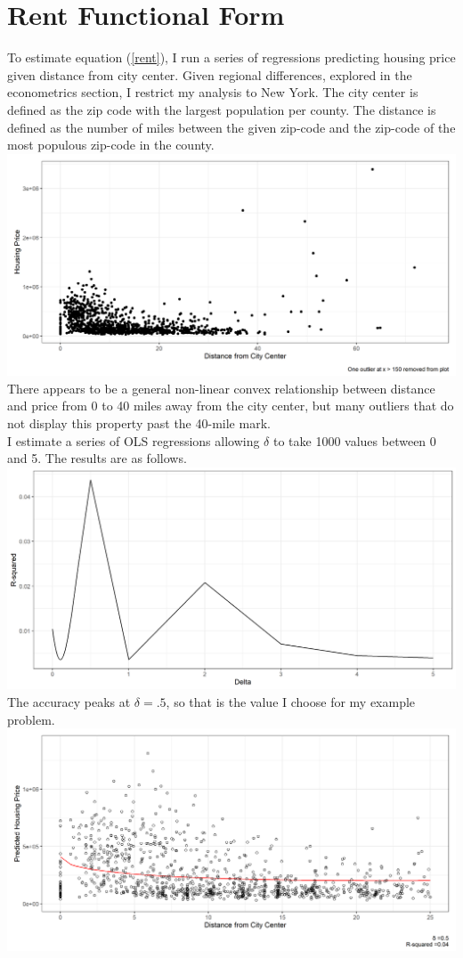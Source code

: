 \documentclass{article}
\begin{document}
\section{Rent Functional Form}
To estimate equation (\ref{rent}), I run a series of regressions predicting housing price given distance from city center. Given regional differences, explored in the econometrics section, I restrict my analysis to New York. The city center is defined as the zip code with the largest population per county. The distance is defined as the number of miles between the given zip-code and the zip-code of the most populous zip-code in the county.\\
\includegraphics[scale=.5]{images/rent_scatter.png}
There appears to be a general non-linear convex relationship between distance and price from 0 to 40 miles away from the city center, but many outliers that do not display this property past the 40-mile mark.\\
I estimate a series of OLS regressions allowing $\delta$ to take 1000 values between 0 and 5. The results are as follows.\\
\includegraphics[scale=.5]{images/delta_fit.png}
The accuracy peaks at $\delta = .5$, so that is the value I choose for my example problem.\\
\includegraphics[scale=.5]{images/delta_plot.png}
\end{document}
